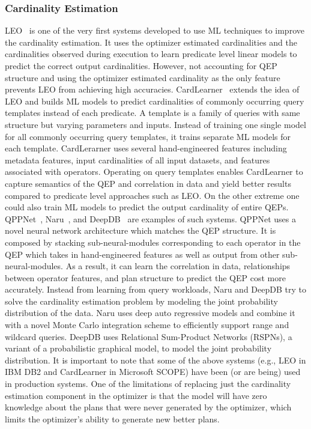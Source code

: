 \subsubsection{Cardinality Estimation}
LEO~\cite{leo} is one of the very first systems developed to use ML techniques to improve the cardinality estimation.
It uses the optimizer estimated cardinalities and the cardinalities observed during execution to learn predicate level linear models to predict the correct output cardinalities.
However, not accounting for QEP structure and using the optimizer estimated cardinality as the only feature prevents LEO from achieving high accuracies.
CardLearner~\cite{cardlearner} extends the idea of LEO and builds ML models to predict cardinalities of commonly occurring query templates instead of each predicate.
A template is a family of queries with same structure but varying parameters and inputs.
Instead of training one single model for all commonly occurring query templates, it trains separate ML models for each template.
CardLerarner uses several hand-engineered features including metadata features, input cardinalities of all input datasets, and features associated with operators.
Operating on query templates enables CardLearner to capture semantics of the QEP and correlation in data and yield better results compared to predicate level approaches such as LEO.
On the other extreme one could also train ML models to predict the output cardinality of entire QEPs.
QPPNet~\cite{qppnet}, Naru~\cite{naru}, and DeepDB~\cite{deepdb} are examples of such systems.
QPPNet uses a novel neural network architecture which matches the QEP structure.
It is composed by stacking sub-neural-modules corresponding to each operator in the QEP which takes in hand-engineered features as well as output from other sub-neural-modules.
As a result, it can learn the correlation in data, relationships between operator features, and plan structure to predict the QEP cost more accurately.
Instead from learning from query workloads, Naru and DeepDB try to solve the cardinality estimation problem by modeling the joint probability distribution of the data.
Naru uses deep auto regressive models and combine it with a novel Monte Carlo integration scheme to efficiently support range and wildcard queries.
DeepDB uses Relational Sum-Product Networks (RSPNs), a variant of a probabilistic graphical model, to model the joint probability distribution.
It is important to note that some of the above systems (e.g., LEO in IBM DB2 and CardLearner in Microsoft SCOPE) have been (or are being) used in production systems.
One of the limitations of replacing just the cardinality estimation component in the optimizer is that the model will have zero knowledge about the plans that were never generated by the optimizer, which limits the optimizer's ability to generate new better plans.

